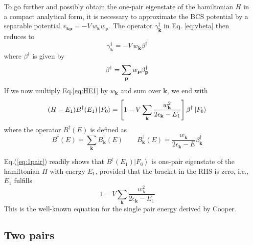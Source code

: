 \documentclass[epj]{svjour}
\newcommand{\vk}{\ensuremath{\mathbf{k}}}
\newcommand{\vp}{\ensuremath{\mathbf{p}}}
\begin{document}
To go further and possibly obtain the one-pair eigenstate of the hamiltonian $H$
in a compact analytical form, it is necessary to approximate the BCS potential by a separable potential $v_{\mathbf{k} \mathbf{p} }=-V\,w_\vk{}w_\vp$.
The operator $\gamma^\dagger_\vk$ in Eq. \eqref{eq:vbeta} then reduces to  
\begin{equation}\gamma^{\dagger}_\vk=-V\,w_\vk\beta^{\dagger}
\end{equation} 
where $\beta^\dagger$ is given by
\begin{equation}  \label{eq:gammaBeta}
\beta^{\dagger}=\sum_%
\vp{}w_\vp\beta^{\dagger}_\vp
\end{equation}
If we  now multiply Eq.\eqref{eq:HE1} by $w_\vk$ and sum over $\mathbf{k} $,
we end with 
\begin{equation}\label{eq:1pair}
(H-E _1)B^{\dagger}(E _1)\left|F_0\right>  =\left[1-V\sum_\vk{%
\frac{w_\vk^2}{2\epsilon_\vk-E _1}}\right]
\beta^{\dagger}\left|F_0\right>  
\end{equation}
where the operator $B^{\dagger}(E)$ is defined as  
\begin{equation}  \label{eq:B}
B^{\dagger}(E)=\sum_\vk{B_\vk^{\dagger}(E)}\quad\quad B_\vk^{\dagger}(E)=\frac{w_\vk}{2\epsilon_\vk-E}\beta^{\dagger}_\vk
\end{equation}

Eq.(\ref{eq:1pair}) readily shows that  $B^{\dagger}(%
E _1)\left|F_0\right> $ is  one-pair eigenstate of the hamiltonian $H$ with energy  $%
E _1$, provided that the bracket in the RHS is zero, i.e., $E_1$  fulfills
\begin{equation}  \label{eq:SchOne}
1=V\sum_\vk{\frac{w_\vk^2}{2\epsilon_\vk-E _1}}
\end{equation}
This is the well-known equation for the single pair energy
derived by Cooper.

\subsection{Two pairs}
\end{document}
